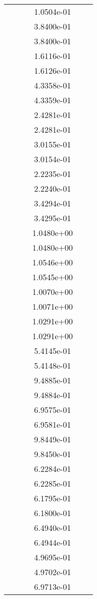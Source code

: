 \begin{xltabular}{\textwidth}{r|rS[table-format=1.3e+2]S[table-format=1.4e+2]S[table-format=1.4e+2]S[table-format=-1.5]}
&  &  & 1.0504e-01 & & \\
&  &  & 3.8400e-01 & & \\
&  &  & 3.8400e-01 & & \\
&  &  & 1.6116e-01 & & \\
&  &  & 1.6126e-01 & & \\
&  &  & 4.3358e-01 & & \\
&  &  & 4.3359e-01 & & \\
&  &  & 2.4281e-01 & & \\
&  &  & 2.4281e-01 & & \\
&  &  & 3.0155e-01 & & \\
&  &  & 3.0154e-01 & & \\
&  &  & 2.2235e-01 & & \\
&  &  & 2.2240e-01 & & \\
&  &  & 3.4294e-01 & & \\
&  &  & 3.4295e-01 & & \\
&  &  & 1.0480e+00 & & \\
&  &  & 1.0480e+00 & & \\
&  &  & 1.0546e+00 & & \\
&  &  & 1.0545e+00 & & \\
&  &  & 1.0070e+00 & & \\
&  &  & 1.0071e+00 & & \\
&  &  & 1.0291e+00 & & \\
&  &  & 1.0291e+00 & & \\
&  &  & 5.4145e-01 & & \\
&  &  & 5.4148e-01 & & \\
&  &  & 9.4885e-01 & & \\
&  &  & 9.4884e-01 & & \\
&  &  & 6.9575e-01 & & \\
&  &  & 6.9581e-01 & & \\
&  &  & 9.8449e-01 & & \\
&  &  & 9.8450e-01 & & \\
&  &  & 6.2284e-01 & & \\
&  &  & 6.2285e-01 & & \\
&  &  & 6.1795e-01 & & \\
&  &  & 6.1800e-01 & & \\
&  &  & 6.4940e-01 & & \\
&  &  & 6.4944e-01 & & \\
&  &  & 4.9695e-01 & & \\
&  &  & 4.9702e-01 & & \\
&  &  & 6.9713e-01 & & \\

\end{xltabular}
